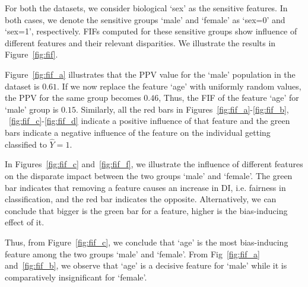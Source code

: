 For both the datasets, we consider biological `sex' as the sensitive features.
In both cases, we denote the sensitive groups `male' and `female' as `sex=0' and `sex=1', respectively. 
FIFs computed for these sensitive groups show influence of different features and their relevant disparities. We illustrate the results in Figure~\ref{fig:fif}.

Figure~\ref{fig:fif_a} illustrates that the PPV value for the `male' population in the dataset is $0.61$. If we now replace the feature `age' with uniformly random values, the PPV for the same group becomes $0.46$, Thus, the FIF of the feature `age' for `male' group is $0.15$.
Similarly, all the red bars in Figures~\ref{fig:fif_a}-\ref{fig:fif_b}, ~\ref{fig:fif_c}-\ref{fig:fif_d} indicate a positive influence of that feature and the green bars indicate a negative influence of the feature on the individual getting classified to $\hat{Y}=1$.

In Figures~\ref{fig:fif_c} and~\ref{fig:fif_f}, we illustrate the influence of different features on the disparate impact between the two groups `male' and `female'. 
The green bar indicates that removing a feature causes an increase in DI, i.e. fairness in classification, and the red bar indicates the opposite. Alternatively, we can conclude that bigger is the green bar for a feature, higher is the bias-inducing effect of it.

Thus, from Figure~\ref{fig:fif_c}, we conclude that `age' is the most bias-inducing feature among the two groups `male' and `female'.
From Fig~\ref{fig:fif_a} and~\ref{fig:fif_b}, we observe that `age' is a decisive feature for `male' while it is comparatively insignificant for `female'.

